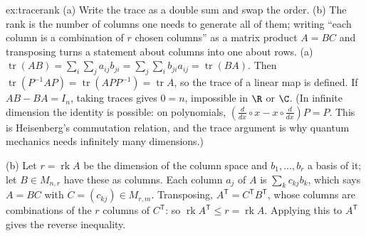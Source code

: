 \begin{solution}{ex:tracerank}
\idea (a) Write the trace as a double sum and swap the order. (b) The rank is the number of columns one needs to generate all of them; writing ``each column is a combination of $r$ chosen columns'' as a matrix product $A=BC$ and transposing turns a statement about columns into one about rows.
\writeup (a) $\operatorname{tr}(AB)=\sum_i\sum_ja_{ij}b_{ji}=\sum_j\sum_ib_{ji}a_{ij}=\operatorname{tr}(BA)$. Then $\operatorname{tr}(P^{-1}AP)=\operatorname{tr}(APP^{-1})=\operatorname{tr}A$, so the trace of a linear map is defined. If $AB-BA=I_n$, taking traces gives $0=n$, impossible in $\R$ or $\C$. (In infinite dimension the identity is possible: on polynomials, $(\frac{d}{dx}\circ x-x\circ\frac{d}{dx})P=P$. This is Heisenberg's commutation relation, and the trace argument is why quantum mechanics needs infinitely many dimensions.)

(b) Let $r=\operatorname{rk}A$ be the dimension of the column space and $b_1,\dots,b_r$ a basis of it; let $B\in M_{n,r}$ have these as columns. Each column $a_j$ of $A$ is $\sum_kc_{kj}b_k$, which says $A=BC$ with $C=(c_{kj})\in M_{r,m}$. Transposing, $A^{\mathsf T}=C^{\mathsf T}B^{\mathsf T}$, whose columns are combinations of the $r$ columns of $C^{\mathsf T}$: so $\operatorname{rk}A^{\mathsf T}\le r=\operatorname{rk}A$. Applying this to $A^{\mathsf T}$ gives the reverse inequality.
\end{solution}

